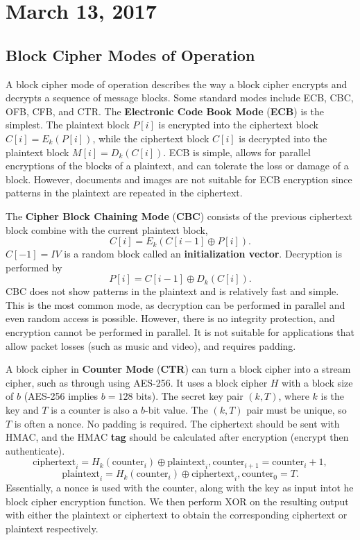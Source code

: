 \documentclass[11pt]{article}
\theoremstyle{plain} %
\theoremstyle{definition}
\theoremstyle{example}
\theoremstyle{remark}
\begin{document}
\section{March 13, 2017}
\subsection{Block Cipher Modes of Operation}

A block cipher mode of operation describes the way a block cipher encrypts and decrypts a sequence of message blocks. Some standard modes include ECB, CBC, OFB, CFB, and CTR. The \textbf{Electronic Code Book Mode} (\textbf{ECB}) is the simplest. The plaintext block $P[i]$ is encrypted into the ciphertext block $C[i] = E_k(P[i])$, while the ciphertext block $C[i]$ is decrypted into the plaintext block $M[i] = D_k(C[i])$. ECB is simple, allows for parallel encryptions of the blocks of a plaintext, and can tolerate the loss or damage of a block. However, documents and images are not suitable for ECB encryption since patterns in the plaintext are repeated in the ciphertext. 

The \textbf{Cipher Block Chaining Mode} (\textbf{CBC}) consists of the previous ciphertext block combine with the current plaintext block,
$$C[i] = E_k(C[i-1] \oplus P[i]).$$
$C[-1] = IV$ is a random block called an \textbf{initialization vector}. Decryption is performed by 
$$P[i] = C[i-1]\oplus D_k(C[i]).$$
CBC does not show patterns in the plaintext and is relatively fast and simple. This is the most common mode, as decryption can be performed in parallel and even random access is possible. However, there is no integrity protection, and encryption cannot be performed in parallel. It is not suitable for applications that allow packet losses (such as music and video), and requires padding. 

A block cipher in \textbf{Counter Mode} (\textbf{CTR}) can turn a block cipher into a stream cipher, such as through using AES-256. It uses a block cipher $H$ with a block size of $b$ (AES-256 implies $b=128$ bits). The secret key pair $(k, T)$, where $k$ is the key and $T$ is a counter is also a $b$-bit value. The $(k,T)$ pair must be unique, so $T$ is often a nonce. No padding is required. The ciphertext should be sent with HMAC, and the HMAC \textbf{tag} should be calculated after encryption (encrypt then authenticate).
$$\text{ciphertext}_i = H_k(\text{counter}_i) \oplus \text{plaintext}_i, \text{counter}_{i+1} = \text{counter}_i + 1,$$
$$\text{plaintext}_i = H_k(\text{counter}_i) \oplus \text{ciphertext}_i, \text{counter}_0 = T.$$
Essentially, a nonce is used with the counter, along with the key as input intot he block cipher encryption function. We then perform XOR on the resulting output with either the plaintext or ciphertext to obtain the corresponding ciphertext or plaintext respectively. 
\end{document}

